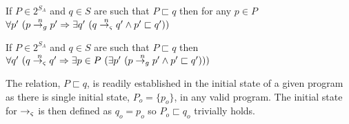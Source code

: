 \begin{corollary}
If $P \in 2^{S_\mathit{A}}$ and $q \in S$ are such that $P \sqsubset q$ then for any $p \in P$
$\forall p^\prime\ (p \stackrel{n}{\rightarrow_{g}} p^\prime \Rightarrow \exists q^\prime\ (q \stackrel{n}{\rightarrow_{\varsigma}} q^\prime \wedge p^\prime \sqsubset q^\prime))$
\end{corollary}

\begin{corollary}
If $P \in 2^{S_\mathit{A}}$ and $q \in S$ are such that $P \sqsubset q$ then
$\forall q^\prime\ (q \stackrel{n}{\rightarrow_{\varsigma}} q^\prime \Rightarrow \exists p \in P\ (\exists p^\prime\ (p \stackrel{n}{\rightarrow_{g}} p^\prime \wedge p^\prime \sqsubset q^\prime)))$
\end{corollary}

The relation, $P \sqsubset q$, is readily established in the initial
state of a given program as there is single initial state, $P_o =
\{p_o\}$, in any valid program. The initial state for $\rightarrow_{\varsigma}$ is
then defined as $q_o = p_o$ so $P_o \sqsubset q_o$ trivially holds.
